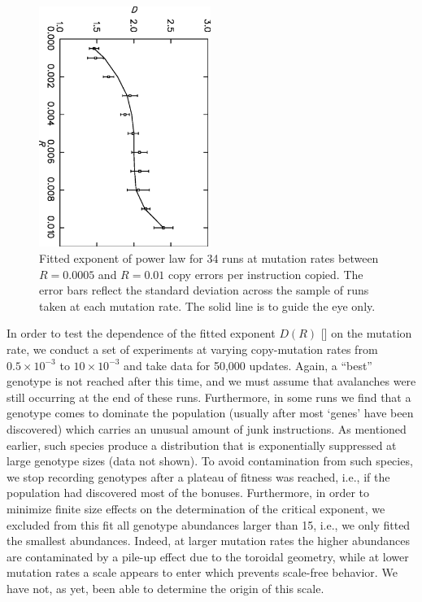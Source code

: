 \documentclass[letterpaper]{article}
\begin{document}
\begin{figure}[ht]
    \centering
    \includegraphics[width=2.2in, angle=90]{fig5.eps}
    \caption{
        Fitted exponent of power law for 34 runs at mutation rates
        between $R=0.0005$ and $R=0.01$ copy errors per instruction
        copied. The error bars reflect the standard deviation across the
        sample of runs taken at each mutation rate. The solid line is to
        guide the eye only.
    }
    \label{fig5}
\end{figure}

In order to test the dependence of the fitted exponent $D(R)$
[] on the mutation rate, we conduct a set of
experiments at varying copy-mutation rates from $0.5\times10^{-3}$ to
$10\times10^{-3}$ and take data for 50,000 updates. Again, a ``best''
genotype is not reached after this time, and we must assume that
avalanches were still occurring at the end of these runs. Furthermore,
in some runs we find that a genotype comes to dominate the population
(usually after most `genes' have been discovered) which carries an
unusual amount of junk instructions. As mentioned earlier, such
species produce a distribution that is exponentially suppressed at
large genotype sizes (data not shown). To avoid contamination from
such species, we stop recording genotypes after a plateau of fitness
was reached, i.e., if the population had discovered most of the
bonuses. Furthermore, in order to minimize finite size effects on the
determination of the critical exponent, we excluded from this fit all
genotype abundances larger than 15, i.e., we only fitted the smallest
abundances. Indeed, at larger mutation rates the higher abundances are
contaminated by a pile-up effect due to the toroidal geometry, while
at lower mutation rates a scale appears to enter which prevents
scale-free behavior. We have not, as yet, been able to determine the
origin of this scale.
\end{document}
